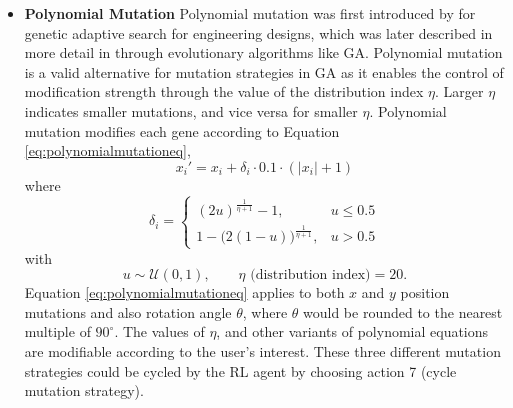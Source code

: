 \documentclass{article}
\begin{document}
\begin{itemize}
\item \textbf{Polynomial Mutation} \newline
Polynomial mutation was first introduced by \textcite{deb1996geneas} for genetic adaptive search for engineering designs, which was later described in more detail in \textcite{deb2001multiobjective} through evolutionary algorithms like GA. Polynomial mutation is a valid alternative for mutation strategies in GA as it enables the control of modification strength through the value of the distribution index $\eta$. Larger $\eta$ indicates smaller mutations, and vice versa for smaller $\eta$. Polynomial mutation modifies each gene according to Equation \ref{eq:polynomialmutationeq},
\begin{equation}
x_i' = x_i + \delta_i \cdot 0.1 \cdot (|x_i| + 1)
\label{eq:polynomialmutationeq}
\end{equation}
where
\[
\delta_i =
\begin{cases}
(2u)^{\frac{1}{\eta+1}} - 1, & u \le 0.5 \\[1ex]
1 - \bigl(2(1-u)\bigr)^{\frac{1}{\eta+1}}, & u > 0.5
\end{cases}
\]
with
\[
u \sim \mathcal{U}(0,1), \qquad \eta \text{ (distribution index)} = 20.
\]
Equation \ref{eq:polynomialmutationeq} applies to both $x$ and $y$ position mutations and also rotation angle $\theta$, where $\theta$ would be rounded to the nearest multiple of $90^\circ$. The values of $\eta$, and other variants of polynomial equations are modifiable according to the user's interest. These three different mutation strategies could be cycled by the RL agent by choosing action 7 (cycle mutation strategy). 
\end{itemize}
\end{document}
